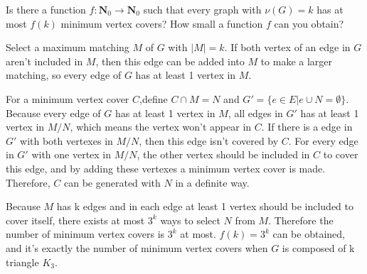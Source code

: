 \documentclass[11pt,a4paper,oneside]{article}
\begin{document}
\begin{problem}{7}
	\statement
   Is there a function $f: \mathbf{N}_0 \rightarrow \mathbf{N}_0$ such that every graph with $\nu(G) = k$ has 
   at most $f(k)$ minimum vertex covers? How small a function $f$ can you obtain?
   
    \solution   
    Select a maximum matching $M$ of $G$ with $|M|=k$. 
    If both vertex of an edge in $G$ aren't included in $M$, then this edge can be added into $M$ to make a larger matching, 
    so every edge of $G$ has at least 1 vertex in $M$.
    
	
	For a minimum vertex cover $C$,define $C\cap M = N$ and $G'=\{ e\in E | e\cup N=\emptyset\}$. 
	Because every edge of $G$ has at least 1 vertex in $M$, all edges in $G'$ has at least 1 vertex in $M/N$, which means the vertex won't appear in $C$. 
	If there is a edge in $G'$ with both vertexes in $M/N$, then this edge isn't covered by $C$. 
	For every edge in $G'$ with one vertex in $M/N$, the other vertex should be included in $C$ to cover this edge, 
	and by adding these vertexes a minimum vertex cover is made.
	Therefore, $C$ can be generated with $N$ in a definite way.

	Because $M$ has k edges and in each edge at least 1 vertex should be included to cover itself, there exists at most $3^k$ ways to select $N$ from $M$.
	Therefore the number of minimum vertex covers is $3^k$ at most.
	$f(k)=3^k$ can be obtained, and it's exactly the number of minimum vertex covers when $G$ is composed of k triangle $K_3$.
\end{problem}
\end{document}
